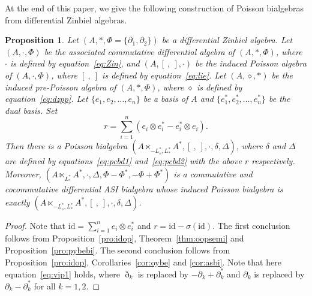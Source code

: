 \documentclass[10pt,a4paper]{amsart}
\numberwithin{equation}{section}
\newtheorem{Proposition}[Theorem]{Proposition}
{ \theoremstyle{definition}
	\newtheorem{Definition}[Theorem]{Definition}
	\newtheorem{Note}[Theorem]{Note}
	\newtheorem{Example}[Theorem]{Example}
	\newtheorem{Remark}[Theorem]{Remark} }
\newcommand{\id}{\mathrm{id}}
\begin{document}
At the end of this paper, we give the following construction of Poisson bialgebras from differential Zinbiel algebras.

\begin{Proposition}Let $(A, \ast, \Phi = \{\partial_1, \partial_2\})$ be a differential Zinbiel algebra.
 Let $(A, \cdot, \Phi)$ be the associated commutative differential algebra of $(A, \ast, \Phi)$,
 where $\cdot$ is defined by equation~\eqref{eq:Zin}, and $(A, [\ ,\ ], \cdot)$ be the induced Poisson algebra of $(A, \cdot, \Phi)$, where $[\ ,\ ]$ is defined by equation~\eqref{eq:lie}.
 Let $(A, \diamond, \ast)$ be the induced pre-Poisson algebra of $(A, \ast, \Phi)$, where $\diamond$ is defined by equation~\eqref{eq:dzpp}.
 Let $\{e_1, e_2,\dots, e_n\}$ be a basis of $A$ and $\{e_1^*, e_2^*, \dots, e_n^*\}$ be the dual basis.
 Set
 \begin{equation*}
 r = \sum_{i=1}^n (e_i \otimes e_i^* - e_i^* \otimes e_i).
 \end{equation*}
 Then there is a Poisson bialgebra $(A \ltimes_{-L^*_{\diamond},L^*_{\ast}} A^*, [\ ,\ ], \cdot, \delta, \Delta)$,
 where $\delta$ and $\Delta$ are defined by equations~\eqref{eq:pcbd1} and~\eqref{eq:pcbd2} with the above $r$ respectively.
 Moreover, $(A \ltimes_{L^*_{\ast}}A^*, \cdot, \Delta, \Phi - \Phi^*, -\Phi + \Phi^*)$
 is a commutative and cocommutative differential ASI bialgebra
 whose induced Poisson bialgebra is exactly $(A \ltimes_{-L^*_{\diamond},L^*_{\ast}} A^*, [\ ,\ ], \cdot, \delta, \Delta)$.
\end{Proposition}
\begin{proof}
 Note that $\id = \sum^n_{i=1} e_i\otimes e_i^*$ and $r = \id - \sigma(\id)$.
 The first conclusion follows from Proposition~\ref{pro:idop}, Theorem~\ref{thm:oopsemi} and Proposition~\ref{pro:pybebi}.
 The second conclusion follows from Proposition~\ref{pro:idop}, Corollaries~\ref{cor:oybe} and \ref{cor:asbi}.
 Note that here equation~\eqref{eq:vip1} holds, where $\eth_k$ is replaced by $-\partial_k + \partial_k^*$ and $\partial_k$ is replaced by $\partial_k - \partial_k^*$ for all $k=1, 2$.
\end{proof}
\end{document}
